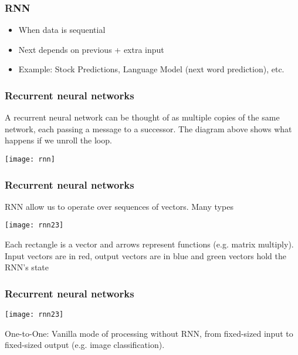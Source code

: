 \begin{frame}[fragile] \frametitle{RNN}
\begin{itemize}
\item When data is sequential
\item Next depends on previous + extra input
\item Example: Stock Predictions, Language Model (next word prediction), etc.
\end{itemize}
\end{frame}





\begin{frame}[fragile] \frametitle{Recurrent neural networks}

A recurrent neural network can be thought of as multiple copies of the same network, each passing a message to a successor. 
The diagram above shows what happens if we unroll the loop. 

\begin{center}
\texttt{[image: rnn]}
\end{center}
\end{frame}


\begin{frame}[fragile] \frametitle{Recurrent neural networks}
RNN allow us to operate over sequences of vectors. Many types
\begin{center}
\texttt{[image: rnn23]}
\end{center}
Each rectangle is a vector and arrows represent functions (e.g. matrix multiply). Input vectors are in red, output vectors are in blue and green vectors hold the RNN's state
\end{frame}



\begin{frame}[fragile] \frametitle{Recurrent neural networks}
\begin{center}
\texttt{[image: rnn23]}
\end{center}
One-to-One: Vanilla mode of processing without RNN, from fixed-sized input to fixed-sized output (e.g. image classification).
\end{frame}

